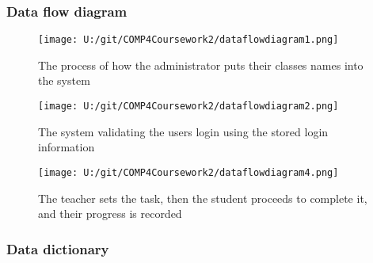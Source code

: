 \subsubsection{Data flow diagram}


\begin{figure}[H]
    \texttt{[image: U:/git/COMP4Coursework2/dataflowdiagram1.png]}
    \caption{The process of how the administrator puts their classes names into the system} \label{fig:print_function_result}
\end{figure}

\begin{figure}[H]
    \texttt{[image: U:/git/COMP4Coursework2/dataflowdiagram2.png]}
    \caption{The system validating the users login using the stored login information} \label{fig:print_function_result}
\end{figure}

\begin{figure}[H]
    \texttt{[image: U:/git/COMP4Coursework2/dataflowdiagram4.png]}
    \caption{The teacher sets the task, then the student proceeds to complete it, and their progress is recorded} \label{fig:print_function_result}
\end{figure}

\subsubsection{Data dictionary}

